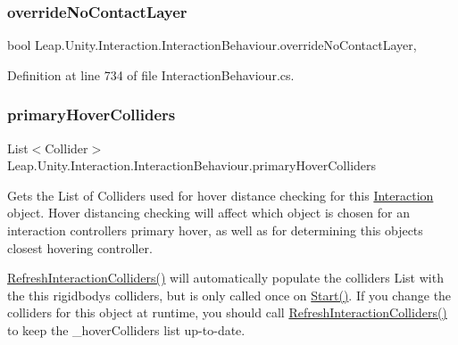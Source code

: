 \subsubsection{\texorpdfstring{overrideNoContactLayer}{overrideNoContactLayer}}
{\footnotesize\ttfamily bool Leap.\+Unity.\+Interaction.\+Interaction\+Behaviour.\+override\+No\+Contact\+Layer\hspace{0.3cm}{\ttfamily [get]}, {\ttfamily [set]}}



Definition at line 734 of file Interaction\+Behaviour.\+cs.

\mbox{\label{class_leap_1_1_unity_1_1_interaction_1_1_interaction_behaviour_abcc862431a7751c499e474799dfcd822}} 
\subsubsection{\texorpdfstring{primaryHoverColliders}{primaryHoverColliders}}
{\footnotesize\ttfamily List$<$Collider$>$ Leap.\+Unity.\+Interaction.\+Interaction\+Behaviour.\+primary\+Hover\+Colliders\hspace{0.3cm}{\ttfamily [get]}}



Gets the List of Colliders used for hover distance checking for this \mbox{\hyperlink{namespace_leap_1_1_unity_1_1_interaction}{Interaction}} object. Hover distancing checking will affect which object is chosen for an interaction controller\textquotesingle{}s primary hover, as well as for determining this object\textquotesingle{}s closest hovering controller. 

\mbox{\hyperlink{class_leap_1_1_unity_1_1_interaction_1_1_interaction_behaviour_a523c4be606d88a5323fb925a04b08c47}{Refresh\+Interaction\+Colliders()}} will automatically populate the colliders List with the this rigidbody\textquotesingle{}s colliders, but is only called once on \mbox{\hyperlink{class_leap_1_1_unity_1_1_interaction_1_1_interaction_behaviour_ae5fabec0a3dbf845c0307b5eb813e993}{Start()}}. If you change the colliders for this object at runtime, you should call \mbox{\hyperlink{class_leap_1_1_unity_1_1_interaction_1_1_interaction_behaviour_a523c4be606d88a5323fb925a04b08c47}{Refresh\+Interaction\+Colliders()}} to keep the \+\_\+hover\+Colliders list up-\/to-\/date. 

